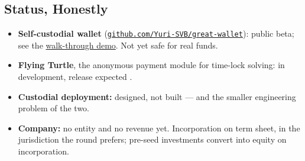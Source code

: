 \subsection{Status, Honestly}
\begin{itemize}
    \item \textbf{Self-custodial wallet} (\href{\appurl}{\texttt{github.com/Yuri-SVB/great-wallet}}): public beta; see the \href{\demourl}{walk-through demo}. Not yet safe for real funds.
    \item \textbf{Flying Turtle}, the anonymous payment module for time-lock solving: in development, release expected \flyingTurtleDate.
    \item \textbf{Custodial deployment:} designed, not built --- and the smaller engineering problem of the two.
    \item \textbf{Company:} no entity and no revenue yet. Incorporation on term sheet, in the jurisdiction the round prefers; pre-seed investments convert into equity on incorporation.
\end{itemize}
